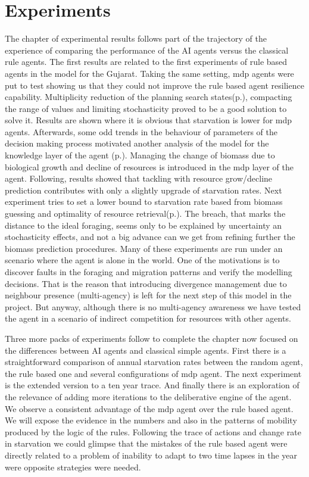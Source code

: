 \documentclass[11pt,oneside,a4paper,openright]{report}
\begin{document}
	
\chapter{Experiments}

The chapter of experimental results follows part of the trajectory of the experience of comparing the 
performance of the AI agents versus the classical rule agents. The first results are related to the first
experiments of rule based agents in the model for the Gujarat\cite{JARM2014}. Taking the same setting, 
mdp agents were put to test showing us that they could not improve the rule based agent resilience capability.  
Multiplicity reduction of the planning search states(p.\pageref{sec:ReduccStates}), compacting the range of values and limiting stochasticity proved to be a good solution to solve it. Results are shown where it is obvious that 
starvation is lower for mdp agents. Afterwards, some odd trends in the behaviour of parameters of the decision 
making process motivated another analysis of the model for the knowledge layer of the agent 
(p.\pageref{sec:Divergence}). 
Managing the change of biomass due to biological growth and decline of resources is introduced in the mdp 
layer of the agent. Following, results showed that tackling with resource grow/decline prediction contributes 
with only a slightly upgrade of starvation rates. Next experiment tries to set a lower bound to starvation 
rate based from biomass guessing and optimality of resource retrieval(p.\pageref{sec:NoDepletionExperiment}). The breach, 
that marks the distance to the ideal foraging, seems only to be explained by uncertainty an stochasticity 
effects, and not a big advance can we get from refining further the biomass prediction procedures. Many of 
these experiments are run under an scenario where the agent is alone in the world. One of the motivations is 
to discover faults in the foraging and migration patterns and verify the modelling decisions.
That is the reason that introducing divergence management due to neighbour presence (multi-agency) is left 
for the next step of this model in the project. But anyway, although there is no multi-agency awareness we 
have tested the agent in a scenario of indirect competition for resources with other agents.

Three more packs of experiments follow to complete the chapter now focused on the differences between AI 
agents and classical simple agents. First there is a straightforward comparison of annual starvation rates
between the random agent, the rule based one and several configurations of mdp agent. The next experiment
is the extended version to a ten year trace. And finally there is an exploration of the relevance of adding 
more iterations to the deliberative engine of the agent. We observe a consistent advantage of the mdp agent
over the rule based agent. We will expose the evidence in the numbers and also in the patterns of mobility 
produced by the logic of the rules. Following the trace of actions and change rate in starvation we could 
glimpse that the mistakes of the rule based agent were directly related to a problem of inability to adapt 
to two time lapses in the year were opposite strategies were needed.
\end{document}
